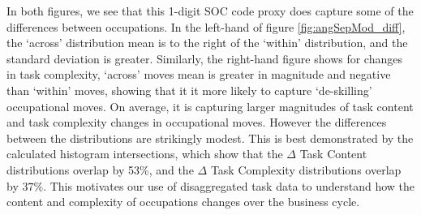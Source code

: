 \documentclass[12pt,authoryear]{elsarticle}
\begin{document}
	In both figures, we see that this 1-digit SOC code proxy does capture some of the differences between occupations. In the left-hand of figure \ref{fig:angSepMod_diff}, the `across' distribution mean is to the right of the `within' distribution, and the standard deviation is greater. Similarly, the right-hand figure shows for changes in task complexity, `across' moves mean is greater in magnitude and negative than `within' moves, showing that it it more likely to capture `de-skilling' occupational moves.  On average, it is capturing larger magnitudes of task content and task complexity changes in occupational moves. However the differences between the distributions are strikingly modest. This is best demonstrated by the calculated histogram intersections, which show that  the $\Delta$ Task Content distributions overlap by 53\%, and the $\Delta$ Task Complexity distributions overlap by $37\%$. This motivates our use of disaggregated task data to understand how the content and complexity of occupations changes over the business cycle. 
	
	
	\begin{comment}
	\begin{figure}[H]
	\centering
	\begin{minipage}{.5\textwidth}
	\centering
	\texttt{[image: ../Figures/all\_diff1Digit\_nonzero]}
	\end{minipage}%
	\begin{minipage}{.5\textwidth}
	\centering
	\texttt{[image: ../Figures/all\_same1Digit\_nonzero]}
	\end{minipage}%
	\caption{$\Delta$Task Content and $\Delta$Task Complexity of potential occupational moves across (left) and within (right) 1-digit SOC codes (excluding zeros)}
	\label{fig:angSep_diff}
	\end{figure}
	\end{comment}
	
	
	
	
	
	
	
	
	
\end{document}
